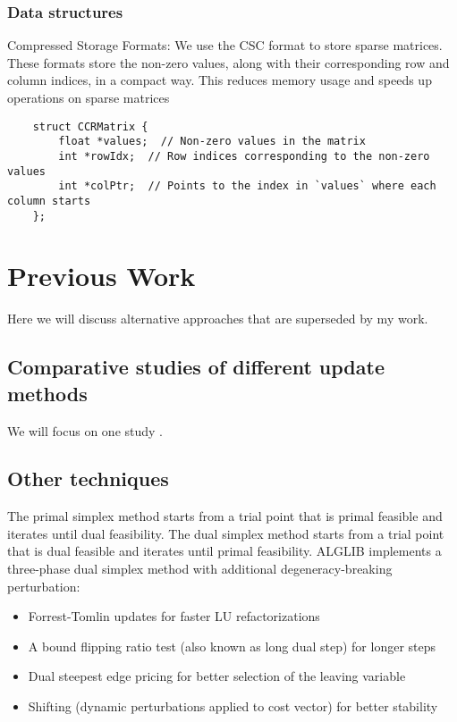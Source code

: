 \subsubsection*{Data structures}
Compressed Storage Formats:
We use the CSC format to store sparse matrices. These formats store the non-zero values, along with their corresponding row and column indices, 
in a compact way. This reduces memory usage and speeds up operations on sparse matrices

\begin{verbatim}
    struct CCRMatrix {
        float *values;  // Non-zero values in the matrix
        int *rowIdx;  // Row indices corresponding to the non-zero values
        int *colPtr;  // Points to the index in `values` where each column starts
    };
\end{verbatim}
\section{Previous Work}
Here we will discuss alternative approaches that are superseded by my work.
\subsection{Comparative studies of different update methods}
We will focus on one study \parencite{huangfu2015novel}.
\subsection{Other techniques}
The primal simplex method starts from a trial point that is primal feasible and iterates until dual feasibility.
The dual simplex method starts from a trial point that is dual feasible and iterates until primal feasibility.
ALGLIB implements a three-phase dual simplex method with additional degeneracy-breaking perturbation:
\begin{itemize}
    \item Forrest-Tomlin updates for faster LU refactorizations
    \item A bound flipping ratio test (also known as long dual step) for longer steps
    \item Dual steepest edge pricing for better selection of the leaving variable
    \item Shifting (dynamic perturbations applied to cost vector) for better stability
\end{itemize}
